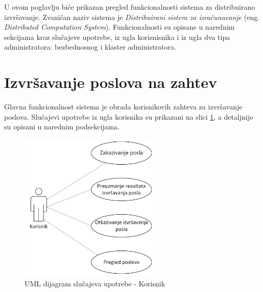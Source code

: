 \documentclass[12pt,oneside]{memoir}
\begin{document}
U ovom poglavlju biće prikazan pregled funkcionalnosti sistema za distribuirano izvršavanje. Zvaničan naziv sistema je \emph{Distribuirani sistem za izračunavanje} (eng. \emph{Distributed Computation System}).
Funkcionalnosti su opisane u narednim sekcijama kroz slučajeve upotrebe, iz ugla korisnisnika i iz ugla dva tipa administratora: bezbednosnog i klaster administratora.

\section{Izvršavanje poslova na zahtev}
Glavna funkcionalnost sistema je obrada korisnikovih zahteva za izvršavanje poslova. 
Slučajevi upotrebe iz ugla korisnika su prikazani na slici \ref{fig:slucajupotrebe_korisnik}, a detaljnije su opisani u narednim podsekcijama.

\begin{figure}[!ht]
  \centering
  \label{fig:slucajupotrebe_korisnik}
  \includegraphics[width=0.6\textwidth]{./images/dijagram_slucajeva_upotrebe_korisnik.png}
  \caption{UML dijagram slučajeva upotrebe - Korisnik}
\end{figure}

\end{document}
